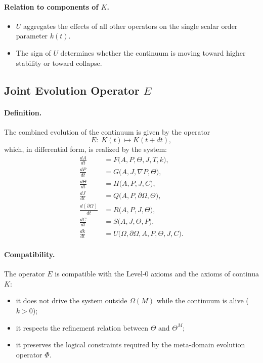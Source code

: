 \paragraph{Relation to components of \texorpdfstring{\(K\)}{K}.}
\begin{itemize}
  \item \(U\) aggregates the effects of all other operators on the single scalar order parameter \(k(t)\).
  \item The sign of \(U\) determines whether the continuum is moving toward higher stability or toward collapse.
\end{itemize}

\subsection{Joint Evolution Operator \texorpdfstring{\(E\)}{E}}

\paragraph{Definition.}
The combined evolution of the continuum is given by the operator
\[
  E:\; K(t)\mapsto K(t+dt),
\]
which, in differential form, is realized by the system:
\begin{align*}
  \frac{dA}{dt}                &= F\bigl(A,P,\Theta,J,T,k\bigr),\\
  \frac{dP}{dt}                &= G\bigl(A,J,\nabla P,\Theta\bigr),\\
  \frac{d\Theta}{dt}           &= H\bigl(A,P,J,C\bigr),\\
  \frac{dJ}{dt}                &= Q\bigl(A,P,\partial\Omega,\Theta\bigr),\\
  \frac{d(\partial\Omega)}{dt} &= R\bigl(A,P,J,\Theta\bigr),\\
  \frac{dC}{dt}                &= S\bigl(A,J,\Theta,P\bigr),\\
  \frac{dk}{dt}                &= U\bigl(\Omega,\partial\Omega,A,P,\Theta,J,C\bigr).
\end{align*}

\paragraph{Compatibility.}
The operator \(E\) is compatible with the Level-0 axioms and the axioms of continua \(K\):
\begin{itemize}
  \item it does not drive the system outside \(\Omega(M)\) while the continuum is alive (\(k>0\));
  \item it respects the refinement relation between \(\Theta\) and \(\Theta^M\);
  \item it preserves the logical constraints required by the meta-domain evolution operator \(\Phi\).
\end{itemize}
